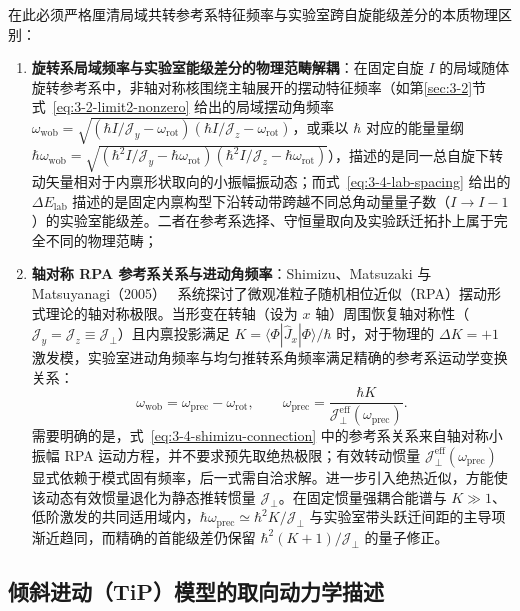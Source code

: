 在此必须严格厘清局域共转参考系特征频率与实验室跨自旋能级差分的本质物理区别：
\begin{enumerate}
\item \textbf{旋转系局域频率与实验室能级差分的物理范畴解耦}：在固定自旋 $I$ 的局域随体旋转参考系中，非轴对称核围绕主轴展开的摆动特征频率（如第\ref{sec:3-2}节式~\eqref{eq:3-2-limit2-nonzero} 给出的局域摆动角频率 $\omega_{\text{wob}} = \sqrt{(\hbar I/\mathcal{J}_y - \omega_{\text{rot}})(\hbar I/\mathcal{J}_z - \omega_{\text{rot}})}$，或乘以 $\hbar$ 对应的能量量纲 $\hbar\omega_{\text{wob}} = \sqrt{(\hbar^2 I/\mathcal{J}_y - \hbar\omega_{\text{rot}})(\hbar^2 I/\mathcal{J}_z - \hbar\omega_{\text{rot}})}$），描述的是同一总自旋下转动矢量相对于内禀形状取向的小振幅振动态；而式~\eqref{eq:3-4-lab-spacing} 给出的 $\Delta E_{\text{lab}}$ 描述的是固定内禀构型下沿转动带跨越不同总角动量量子数（$I \to I-1$）的实验室能级差。二者在参考系选择、守恒量取向及实验跃迁拓扑上属于完全不同的物理范畴；
\item \textbf{轴对称 RPA 参考系关系与进动角频率}：Shimizu、Matsuzaki 与 Matsuyanagi（2005）~\cite{shimizu-2005-high-k-precession} 系统探讨了微观准粒子随机相位近似（RPA）摆动形式理论的轴对称极限。当形变在转轴（设为 $x$ 轴）周围恢复轴对称性（$\mathcal{J}_y = \mathcal{J}_z \equiv \mathcal{J}_\perp$）且内禀投影满足 $K = \langle \Phi | \hat{J}_x | \Phi \rangle / \hbar$ 时，对于物理的 $\Delta K = +1$ 激发模，实验室进动角频率与均匀推转系角频率满足精确的参考系运动学变换关系：
\begin{equation}\label{eq:3-4-shimizu-connection}
\omega_{\text{wob}} = \omega_{\text{prec}} - \omega_{\text{rot}}, \qquad \omega_{\text{prec}} = \frac{\hbar K}{\mathcal{J}_\perp^{\text{eff}}(\omega_{\text{prec}})}.
\end{equation}
需要明确的是，式~\eqref{eq:3-4-shimizu-connection} 中的参考系关系来自轴对称小振幅 RPA 运动方程，并不要求预先取绝热极限；有效转动惯量 $\mathcal{J}_\perp^{\text{eff}}(\omega_{\text{prec}})$ 显式依赖于模式固有频率，后一式需自洽求解。进一步引入绝热近似，方能使该动态有效惯量退化为静态推转惯量 $\mathcal{J}_\perp$。在固定惯量强耦合能谱与 $K \gg 1$、低阶激发的共同适用域内，$\hbar \omega_{\text{prec}} \simeq \hbar^2 K / \mathcal{J}_\perp$ 与实验室带头跃迁间距的主导项渐近趋同，而精确的首能级差仍保留 $\hbar^2(K+1)/\mathcal{J}_\perp$ 的量子修正。
\end{enumerate}

\subsection{倾斜进动（TiP）模型的取向动力学描述}\label{sec:3-4-2}

